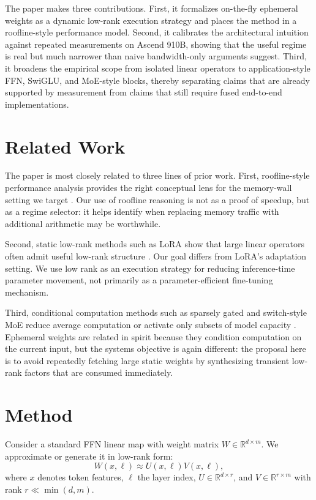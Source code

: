 \documentclass[11pt]{article}
\begin{document}
The paper makes three contributions. First, it formalizes on-the-fly ephemeral weights as a dynamic low-rank execution strategy and places the method in a roofline-style performance model. Second, it calibrates the architectural intuition against repeated measurements on Ascend 910B, showing that the useful regime is real but much narrower than naive bandwidth-only arguments suggest. Third, it broadens the empirical scope from isolated linear operators to application-style FFN, SwiGLU, and MoE-style blocks, thereby separating claims that are already supported by measurement from claims that still require fused end-to-end implementations.

\section{Related Work}
The paper is most closely related to three lines of prior work. First, roofline-style performance analysis provides the right conceptual lens for the memory-wall setting we target \cite{williams2009roofline}. Our use of roofline reasoning is not as a proof of speedup, but as a regime selector: it helps identify when replacing memory traffic with additional arithmetic may be worthwhile.

Second, static low-rank methods such as LoRA show that large linear operators often admit useful low-rank structure \cite{hu2021lora}. Our goal differs from LoRA's adaptation setting. We use low rank as an execution strategy for reducing inference-time parameter movement, not primarily as a parameter-efficient fine-tuning mechanism.

Third, conditional computation methods such as sparsely gated and switch-style MoE reduce average computation or activate only subsets of model capacity \cite{shazeer2017outrageously,fedus2022switch}. Ephemeral weights are related in spirit because they condition computation on the current input, but the systems objective is again different: the proposal here is to avoid repeatedly fetching large static weights by synthesizing transient low-rank factors that are consumed immediately.

\section{Method}
Consider a standard FFN linear map with weight matrix $W \in \mathbb{R}^{d \times m}$. We approximate or generate it in low-rank form:
\[
W(x,\ell) \approx U(x,\ell)V(x,\ell),
\]
where $x$ denotes token features, $\ell$ the layer index, $U \in \mathbb{R}^{d \times r}$, and $V \in \mathbb{R}^{r \times m}$ with rank $r \ll \min(d,m)$.
\end{document}
